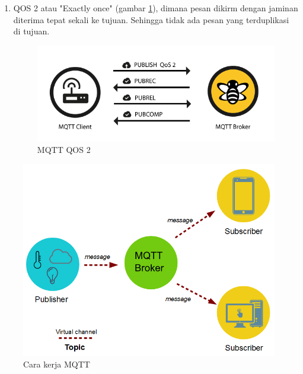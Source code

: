 \begin{enumerate}
	\item QOS 2 atau "Exactly once" (gambar \ref{fig:mqtt2}), dimana pesan dikirm dengan jaminan diterima tepat sekali ke tujuan. Sehingga tidak ada pesan yang terduplikasi di tujuan.	
	
\begin{figure}[H]
	\centering
	\includegraphics[scale=0.3]{images/qos2.png}	
	\caption{MQTT QOS 2}
	\label{fig:mqtt2}
\end{figure}
\end{enumerate}

\begin{figure}[H]
	\centering
	\includegraphics[scale=0.35]{images/mqtt.png}
	\caption{Cara kerja MQTT}
	\label{fig:how_mqtt}
\end{figure}
